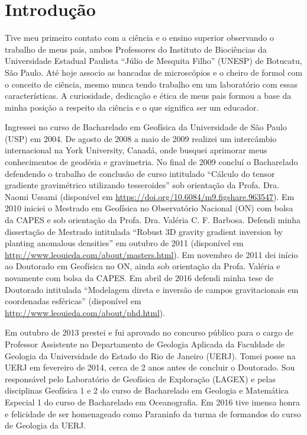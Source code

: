 \section{Introdução}


Tive meu primeiro contato com a ciência e o ensino superior observando o
trabalho de meus pais, ambos Professores do Instituto de Biociências da
Universidade Estadual Paulista ``Júlio de Mesquita Filho'' (UNESP) de Botucatu,
São Paulo.
Até hoje associo as bancadas de microscópios e o cheiro de formol com o
conceito de ciência, mesmo nunca tendo trabalho em um laboratório com essas
características.
A curiosidade, dedicação e ética de meus pais formou a base da minha posição a
respeito da ciência e o que significa ser um educador.

Ingressei no curso de Bacharelado em Geofísica da Universidade de São
Paulo (USP) em 2004.
De agosto de 2008 a maio de 2009 realizei um intercâmbio internacional na York
University, Canadá, onde busquei aprimorar meus conhecimentos de geodésia e
gravimetria.
No final de 2009 concluí o Bacharelado defendendo o trabalho de conclusão de
curso intitulado ``Cálculo do tensor gradiente gravimétrico utilizando
tesseroides'' sob orientação da Profa. Dra. Naomi Ussami
(disponível em \url{https://doi.org/10.6084/m9.figshare.963547}).
Em 2010 iniciei o Mestrado em Geofísica no Observatório Nacional (ON) com bolsa
da CAPES e sob orientação da Profa. Dra. Valéria C. F. Barbosa.
Defendi minha dissertação de Mestrado intitulada ``Robust 3D gravity gradient
inversion by planting anomalous densities'' em outubro de 2011 (disponível em
\url{http://www.leouieda.com/about/masters.html}).
Em novembro de 2011 dei início ao Doutorado em Geofísica no ON, ainda sob
orientação da Profa. Valéria e novamente com bolsa da CAPES.
Em abril de 2016 defendi minha tese de Doutorado intitulada ``Modelagem direta
e inversão de campos gravitacionais em coordenadas esféricas''
(disponível em \url{http://www.leouieda.com/about/phd.html}).

Em outubro de 2013 prestei e fui aprovado no concurso público para o cargo de
Professor Assistente no Departamento de Geologia Aplicada da Faculdade de
Geologia da Universidade do Estado do Rio de Janeiro (UERJ).
Tomei posse na UERJ em fevereiro de 2014, cerca de 2 anos antes de concluir o
Doutorado.
Sou responsável pelo Laboratório de Geofísica de Exploração (LAGEX) e pelas
disciplinas Geofísica 1 e 2 do curso de Bacharelado em Geologia e Matemática
Especial 1 do curso de Bacharelado em Oceanografia.
Em 2016 tive imensa honra e felicidade de ser homenageado como Paraninfo da
turma de formandos do curso de Geologia da UERJ.

